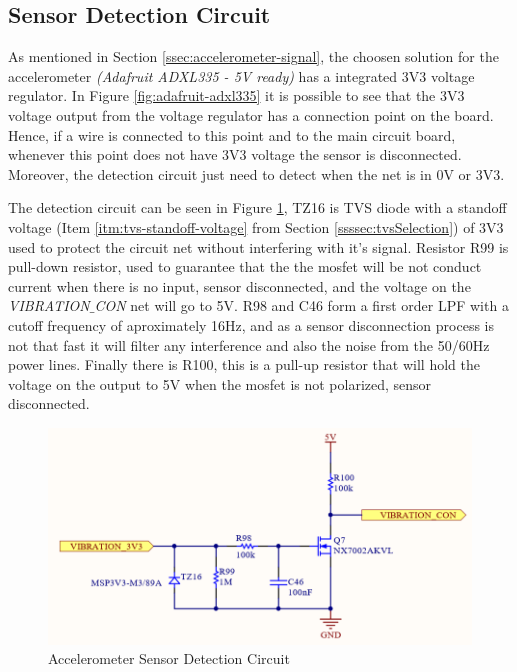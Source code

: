 \subsection{Sensor Detection Circuit}\label{ssec:accelerometer-sensor-detection-circuit}

	As mentioned in Section \ref{ssec:accelerometer-signal}, the choosen solution for the accelerometer \textit{(Adafruit ADXL335 - 5V ready)} has a integrated 3V3 voltage regulator. In Figure \ref{fig:adafruit-adxl335} it is possible to see that the 3V3 voltage output from the voltage regulator has a connection point on the board. Hence, if a wire is connected to this point and to the main circuit board, whenever this point does not have 3V3 voltage the sensor is disconnected. Moreover, the detection circuit just need to detect when the net is in 0V or 3V3.
	\par
	The detection circuit can be seen in Figure \ref{fig:accelerometer-sensor-detection-circuit}, TZ16 is TVS diode with a standoff voltage (Item \ref{itm:tvs-standoff-voltage} from Section \ref{ssssec:tvsSelection}) of 3V3 used to protect the circuit net without interfering with it's signal. Resistor R99 is pull-down resistor, used to guarantee that the the mosfet will be not conduct current when there is no input, sensor disconnected, and the voltage on the \textit{VIBRATION$\_$CON} net will go to 5V. R98 and C46 form a first order LPF with a cutoff frequency of aproximately 16Hz, and as a sensor disconnection process is not that fast it will filter any interference and also the noise from the 50/60Hz power lines. Finally there is R100, this is a pull-up resistor that will hold the voltage on the output to 5V when the mosfet is not polarized, sensor disconnected.

	\begin{figure}[htbp]
		\centering
			\includegraphics[scale=1.5]{figuras/fig-accelerometer-sensor-detection-circuit.png}
		\caption{Accelerometer Sensor Detection Circuit \cite{accelerometer-sensor-detection-circuit}}
		\label{fig:accelerometer-sensor-detection-circuit}
	\end{figure}
